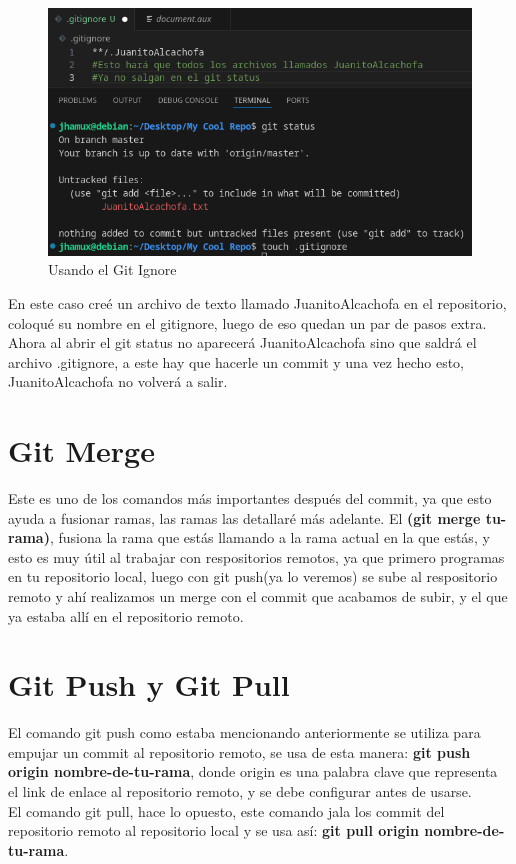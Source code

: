 \documentclass[13pt]{article}
\begin{document}
\begin{figure}[H]
	\centering
	\includegraphics[scale=0.5]{Images/gitignore.png}
	\caption {\small Usando el Git Ignore}
\end{figure}

En este caso creé un archivo de texto llamado JuanitoAlcachofa en el repositorio, coloqué su nombre en el gitignore, luego de eso quedan un par de pasos extra.\\
Ahora al abrir el git status no aparecerá JuanitoAlcachofa sino que saldrá el archivo .gitignore, a este hay que hacerle un commit y una vez hecho esto, JuanitoAlcachofa no volverá a salir.

\section{Git Merge}
Este es uno de los comandos más importantes después del commit, ya que esto ayuda a fusionar ramas, las ramas las detallaré más adelante. El \textbf{(git merge tu-rama)}, fusiona la rama que estás llamando a la rama actual en la que estás, y esto es muy útil al trabajar con respositorios remotos, ya que primero programas en tu repositorio local, luego con git push(ya lo veremos) se sube al respositorio remoto y ahí realizamos un merge con el commit que acabamos de subir, y el que ya estaba allí en el repositorio remoto.

\section{Git Push y Git Pull}
El comando git push como estaba mencionando anteriormente se utiliza para empujar un commit al repositorio remoto, se usa de esta manera: \textbf{git push origin nombre-de-tu-rama}, donde origin es una palabra clave que representa el link de enlace al repositorio remoto, y se debe configurar antes de usarse.\\

El comando git pull, hace lo opuesto, este comando jala los commit del repositorio remoto al repositorio local y se usa así: \textbf{git pull origin nombre-de-tu-rama}.
\end{document}
